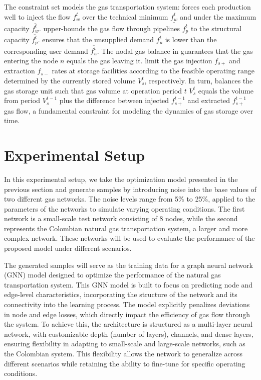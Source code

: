 The constraint set models the gas transportation system:  forces each production well to inject the flow $f_{w}^t$ over the technical minimum $\underline{f_{w}^t}$ and under the maximum capacity $\overline{f_{w}^t}$.  upper-bounds the gas flow through pipelines $f_{p}^t$ to the structural capacity $\overline{f_{p}^t}$.  ensures that the unsupplied demand $f_{u}^{t}$ is lower than the corresponding user demand $\overline{f_{u}^{t}}$. The nodal gas balance in  guarantees that the gas entering the node $n$ equals the gas leaving it.  limit the gas injection $f_{s+}$  and extraction $f_{s-}$ rates at storage facilities according to the feasible operating range determined by the currently stored volume $V_{s}^t$, respectively. In turn,  balances the gas storage unit such that gas volume at operation period $t$ $V_{s}^t$ equals the volume from period $V_{s}^{t-1}$ plus the difference between injected $f_{s+}^{t-1}$ and extracted $f_{s+}^{t-1}$ gas flow, a fundamental constraint for modeling the dynamics of gas storage over time. 

\section{Experimental Setup}


In this experimental setup, we take the optimization model presented in the previous section and generate samples by introducing noise into the base values of two different gas networks. The noise levels range from 5\% to 25\%, applied to the parameters of the networks to simulate varying operating conditions. The first network is a small-scale test network consisting of 8 nodes, while the second represents the Colombian natural gas transportation system, a larger and more complex network. These networks will be used to evaluate the performance of the proposed model under different scenarios.

The generated samples will serve as the training data for a graph neural network (GNN) model designed to optimize the performance of the natural gas transportation system. This GNN model is built to focus on predicting node and edge-level characteristics, incorporating the structure of the network and its connectivity into the learning process. The model explicitly penalizes deviations in node and edge losses, which directly impact the efficiency of gas flow through the system. To achieve this, the architecture is structured as a multi-layer neural network, with customizable depth (number of layers), channels, and dense layers, ensuring flexibility in adapting to small-scale and large-scale networks, such as the Colombian system. This flexibility allows the network to generalize across different scenarios while retaining the ability to fine-tune for specific operating conditions.


